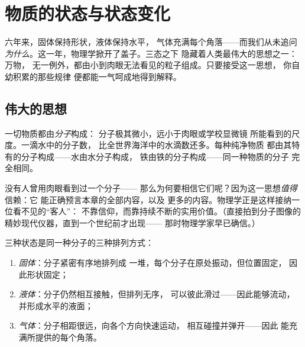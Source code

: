 \chapter{物质的状态与状态变化}\label{ch:g7:states-of-matter}

六年来，固体保持形状，液体保持水平，
气体充满每个角落——而我们从未追问
\emph{为什么}。这一年，物理学掀开了盖子。三态之下
隐藏着人类最伟大的思想之一：万物，
无一例外，都由小到肉眼无法看见的粒子组成。只要接受这一思想，
你自幼积累的那些规律
便都能一气呵成地得到解释。

\section{伟大的思想}

\begin{definition}[分子]\label{def:g7:states-of-matter:molecule}
一切物质都由\emph{分子}构成：
分子极其微小，远小于肉眼或学校显微镜
所能看到的尺度。一滴水中的分子数，
比全世界海洋中的水滴数还多。每种纯净物质
都由其特有的分子构成——水由水分子构成，
铁由铁的分子构成——同一种物质的分子
完全相同。
\end{definition}

\begin{remark}[不见而信]\label{rem:g7:states-of-matter:believing}
没有人曾用肉眼看到过一个分子——
那么为何要相信它们呢？因为这一思想\emph{值得}信赖：它
能正确预言本章的全部内容，以及
更多的内容。物理学正是这样接纳一位看不见的“客人”：
不靠信仰，而靠持续不断的实用价值。（直接拍到分子图像的
精妙现代仪器，直到一个世纪前才出现——
那时物理学家早已确信。）
\end{remark}

\begin{proposition}[三态的粒子模型]\label{prop:g7:states-of-matter:model}
三种状态是同一种分子的三种排列方式：
\begin{enumerate}
  \item \emph{固体}：分子紧密有序地排列成
        一堆，每个分子在原处振动，但位置固定，
        因此形状固定；
  \item \emph{液体}：分子仍然相互接触，但排列无序，
        可以彼此滑过——因此能够流动，
        并形成水平的液面；
  \item \emph{气体}：分子相距很远，向各个方向快速运动，
        相互碰撞并弹开——因此
        能充满所提供的每个角落。
\end{enumerate}
\end{proposition}

